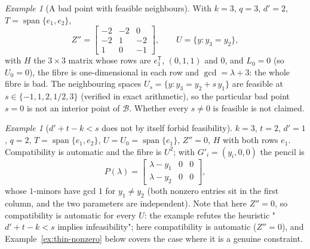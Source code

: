 \documentclass[journal]{IEEEtran}
\theoremstyle{plainn}
\theoremstyle{remark}
\newtheorem{example}[thm]{Example}
\begin{document}
\begin{example}[A bad point with feasible neighbours]\label{ex:bad}
With $k=3$, $q=3$, $d'=2$, $T=\operatorname{span}\{e_1,e_2\}$,
\[
Z''=\begin{bmatrix}-2&-2&0\\-2&1&-2\\1&0&-1\end{bmatrix},\qquad
U=\{y:y_3=y_2\},
\]
with $H$ the $3\times3$ matrix whose rows are $e_1^{\mathsf T}$, $(0,1,1)$ and $0$, and $L_0=0$ (so
$U_0=0$), the fibre is one-dimensional in each row and $\gcd=\lambda+3$: the whole fibre is bad. The
neighbouring spaces $U_s=\{y:y_3=y_2+s\,y_1\}$ are feasible at $s\in\{-1,1,2,1/2,3\}$ (verified in exact
arithmetic), so the particular bad point $s=0$ is not an interior point of $\mathcal B$. Whether every
$s\ne0$ is feasible is not claimed.
\end{example}

\begin{example}[$d'+t-k<s$ does not by itself forbid feasibility]\label{ex:thin}
$k=3$, $t=2$, $d'=1$, $q=2$, $T=\operatorname{span}\{e_1,e_2\}$, $U=U_0=\operatorname{span}\{e_1\}$,
$Z''=0$, $H$ with both rows $e_1$. Compatibility is automatic and the fibre is $U^{2}$; with
$G'_i=(y_i,0,0)$ the pencil is
\[
P(\lambda)=\begin{bmatrix}\lambda-y_1&0&0\\ \lambda-y_2&0&0\end{bmatrix},
\]
whose $1$-minors have gcd $1$ for $y_1\ne y_2$ (both nonzero entries sit in the first column, and the
two parameters are independent). Note that here $Z''=0$, so compatibility is automatic for every $U$:
the example refutes the heuristic "$d'+t-k<s$ implies infeasibility"; here compatibility is automatic
($Z''=0$), and Example~\ref{ex:thin-nonzero} below covers the case where it is a genuine constraint.
\end{example}
\end{document}
